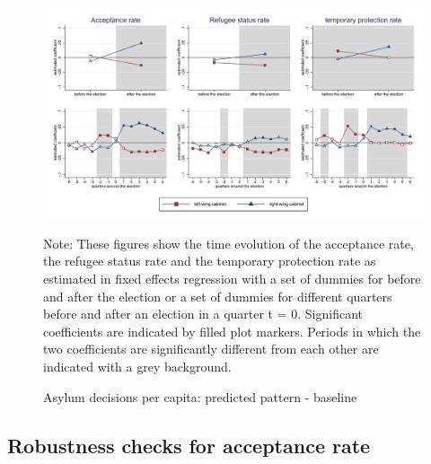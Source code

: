 \documentclass[11pt,a4paper]{scrartcl}
\begin{document}
\clearpage
\FloatBarrier
\begin{figure}[!ht]
	
	\caption{Asylum decisions per capita: predicted pattern - baseline}
	\centering
	\begin{minipage}{1\textwidth} 
		\includegraphics[width=\linewidth]{../results/decisions/dec_graphs_baseline.pdf}
		{\scriptsize Note: These figures show the time evolution of the acceptance rate, the refugee status rate and the temporary protection rate as estimated in fixed effects regression with a set of dummies for before and after the election or a set of dummies for different quarters before and after an election in a quarter t = 0. Significant coefficients are indicated by filled plot markers. Periods in which the two coefficients are significantly different from each other are indicated with a grey background. \par}
	\end{minipage}
\end{figure}






\clearpage
\FloatBarrier
\subsection{Robustness checks for acceptance rate}


\end{document}
